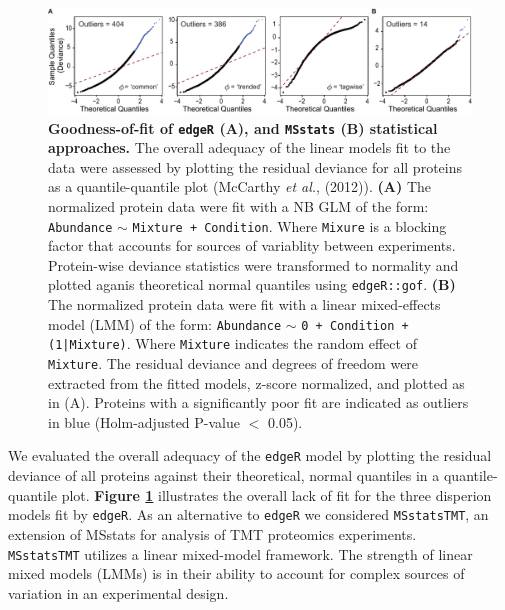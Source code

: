 \documentclass[11pt]{elife}\usepackage[]{graphicx}\usepackage[]{color}
\begin{document}
\begin{figure}[ht]
	\begin{fullwidth}
		\begin{center}
		\includegraphics[width=0.9\paperwidth,keepaspectratio]{gof}
		\caption{\textbf{Goodness-of-fit of \texttt{edgeR} (A), and 
		\texttt{MSstats} (B) statistical approaches.} The overall
		adequacy of the linear models fit to the data were assessed 
		by plotting the residual deviance for all proteins as a 
		quantile-quantile plot (McCarthy \textit{et al.}, (2012)). 
		\textbf{(A)} The normalized
		protein data were fit with a NB GLM of the form: 
		\texttt{Abundance} $\sim$ \texttt{Mixture + Condition}.
		Where \texttt{Mixure} is a blocking factor that accounts for
		sources of variablity between experiments. Protein-wise deviance
		statistics were transformed to normality and plotted aganis
		theoretical normal quantiles using \texttt{edgeR::gof}.
		\textbf{(B)}
		The normalized protein data were fit with a linear mixed-effects 
		model (LMM) of the form: 
		\texttt{Abundance} $\sim$ \texttt{0 + Condition + (1|Mixture)}. 
		Where \texttt{Mixture} indicates the random effect
		of \texttt{Mixture}. The residual deviance and degrees of 
		freedom were extracted from the fitted models, z-score
		normalized, and plotted as in (A). Proteins with a significantly 
		poor fit are indicated as outliers in blue 
		(Holm-adjusted P-value $<$ 0.05).}
		\label{fig:gof}
	\end{center}
	\end{fullwidth}
\end{figure}

We evaluated the overall adequacy of the \texttt{edgeR} model by plotting the 
residual deviance of all proteins against their theoretical, 
normal quantiles in a quantile-quantile plot. \textbf{Figure \ref{fig:gof}} 
illustrates the overall lack of fit for the three disperion models fit by 
\texttt{edgeR}.  As an alternative to \texttt{edgeR} we considered 
\texttt{MSstatsTMT}, an extension of MSstats for analysis of TMT proteomics
experiments. \\

\texttt{MSstatsTMT} utilizes a linear mixed-model framework. The strength of 
linear mixed models (LMMs) is in their ability to account for complex sources of 
variation in an experimental design. 
\end{document}
